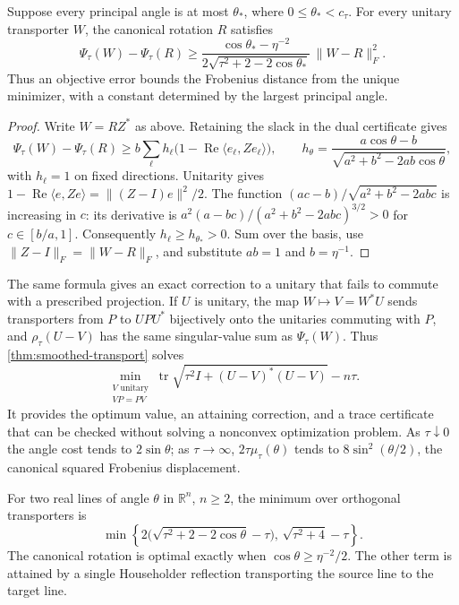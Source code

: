 \begin{corollary}
\label{cor:smoothed-stability}
Suppose every principal angle is at most $\theta_*$, where
$0\leq\theta_*<c_\tau$. For every
unitary transporter $W$, the canonical rotation $R$ satisfies
\[
 \Psi_\tau(W)-\Psi_\tau(R)
 \geq
 \frac{\cos\theta_*-\eta^{-2}}
      {2\sqrt{\tau^2+2-2\cos\theta_*}}\,\|W-R\|_F^2.
\]
Thus an objective error bounds the Frobenius distance from the unique
minimizer, with a constant determined by the largest principal angle.
\end{corollary}

\begin{proof}
Write $W=RZ^*$ as above. Retaining the slack in the dual certificate gives
\[
 \Psi_\tau(W)-\Psi_\tau(R)
 \geq b\sum_\ell h_\ell
       \bigl(1-\operatorname{Re}\langle e_\ell,Ze_\ell\rangle\bigr),
 \qquad
 h_\theta=\frac{a\cos\theta-b}
                  {\sqrt{a^2+b^2-2ab\cos\theta}},
\]
with $h_\ell=1$ on fixed directions. Unitarity gives
$1-\operatorname{Re}\langle e,Ze\rangle=\|(Z-I)e\|^2/2$.
The function $(ac-b)/\sqrt{a^2+b^2-2abc}$ is increasing in $c$:
its derivative is
$a^2(a-bc)/(a^2+b^2-2abc)^{3/2}>0$ for $c\in[b/a,1]$.
Consequently $h_\ell\geq h_{\theta_*}>0$. Sum over the basis, use
$\|Z-I\|_F=\|W-R\|_F$, and substitute $ab=1$ and $b=\eta^{-1}$.
\end{proof}

The same formula gives an exact correction to a unitary that fails to
commute with a prescribed projection. If $U$ is unitary, the map
$W\mapsto V=W^*U$ sends transporters from $P$ to $UPU^*$ bijectively
onto the unitaries commuting with $P$, and
$\rho_\tau(U-V)$ has the same singular-value sum as $\Psi_\tau(W)$.
Thus \cref{thm:smoothed-transport} solves
\[
 \min_{\substack{V\text{ unitary}\\VP=PV}}
 \operatorname{tr}\sqrt{\tau^2I+(U-V)^*(U-V)}-n\tau.
\]
It provides the optimum value, an attaining correction, and a trace
certificate that can be checked without solving a nonconvex optimization
problem. As $\tau\downarrow0$ the angle cost tends to $2\sin\theta$;
as $\tau\to\infty$, $2\tau\mu_\tau(\theta)$ tends to
$8\sin^2(\theta/2)$, the canonical squared Frobenius displacement.

\begin{corollary}
\label{cor:smoothed-real-line}
For two real lines of angle $\theta$ in $\mathbb R^n$, $n\geq2$,
the minimum over orthogonal transporters is
\[
 \min\left\{
  2\bigl(\sqrt{\tau^2+2-2\cos\theta}-\tau\bigr),\,
  \sqrt{\tau^2+4}-\tau\right\}.
\]
The canonical rotation is optimal exactly when
$\cos\theta\geq\eta^{-2}/2$. The other term is attained by a single
Householder reflection transporting the source line to the target line.
\end{corollary}

